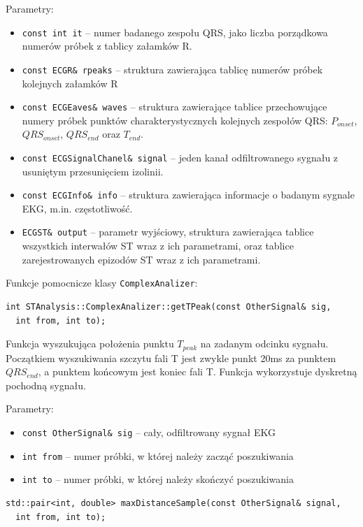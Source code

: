 \documentclass[a4paper, 11pt]{article}
\begin{document}
Parametry:
\begin{itemize}
  \item \verb|const int it| -- numer badanego zespołu QRS, jako liczba
    porządkowa numerów próbek z tablicy załamków R.
  \item \verb|const ECGR& rpeaks| -- struktura zawierająca tablicę numerów
    próbek kolejnych załamków R
  \item \verb|const ECGEaves& waves| -- struktura zawierające tablice
    przechowujące numery próbek punktów charakterystycznych kolejnych zespołów
    QRS: $P_{onset}$, $QRS_{onset}$, $QRS_{end}$ oraz $T_{end}$.
  \item \verb|const ECGSignalChanel& signal| -- jeden kanał odfiltrowanego
    sygnału z usuniętym przesunięciem izolinii.
  \item \verb|const ECGInfo& info| -- struktura zawierająca informacje o badanym
    sygnale EKG, m.in. częstotliwość.
  \item \verb|ECGST& output| -- parametr wyjściowy, struktura zawierająca
    tablice wszystkich interwałów ST wraz z ich parametrami, oraz tablice
    zarejestrowanych epizodów ST wraz z ich parametrami.
\end{itemize}

Funkcje pomocnicze klasy \verb|ComplexAnalizer|:

\begin{lstlisting}
int STAnalysis::ComplexAnalizer::getTPeak(const OtherSignal& sig,
  int from, int to);
\end{lstlisting}

Funkcja wyszukująca położenia punktu $T_{peak}$ na zadanym odcinku sygnału.
Początkiem wyszukiwania szczytu fali T jest zwykle punkt 20ms za punktem
$QRS_{end}$, a punktem końcowym jest koniec fali T. Funkcja wykorzystuje
dyskretną pochodną sygnału.

Parametry:
\begin{itemize}
  \item \verb|const OtherSignal& sig|  -- cały, odfiltrowany sygnał EKG
  \item \verb|int from|  -- numer próbki, w której należy zacząć poszukiwania
  \item \verb|int to|  -- numer próbki, w której należy skończyć poszukiwania
\end{itemize}


\begin{lstlisting}
std::pair<int, double> maxDistanceSample(const OtherSignal& signal, 
  int from, int to);
\end{lstlisting}
\end{document}
